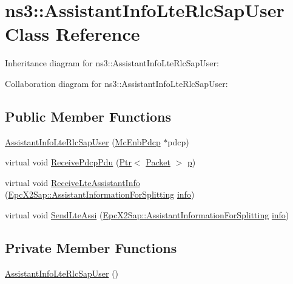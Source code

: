 \hypertarget{classns3_1_1AssistantInfoLteRlcSapUser}{}\section{ns3\+:\+:Assistant\+Info\+Lte\+Rlc\+Sap\+User Class Reference}
\label{classns3_1_1AssistantInfoLteRlcSapUser}


Inheritance diagram for ns3\+:\+:Assistant\+Info\+Lte\+Rlc\+Sap\+User\+:


Collaboration diagram for ns3\+:\+:Assistant\+Info\+Lte\+Rlc\+Sap\+User\+:
\subsection*{Public Member Functions}
\begin{DoxyCompactItemize}
\item 
\hyperlink{classns3_1_1AssistantInfoLteRlcSapUser_ac749cd032c4e18aeb183f85ae42375d1}{Assistant\+Info\+Lte\+Rlc\+Sap\+User} (\hyperlink{classns3_1_1McEnbPdcp}{Mc\+Enb\+Pdcp} $\ast$pdcp)
\item 
virtual void \hyperlink{classns3_1_1AssistantInfoLteRlcSapUser_af472b0a5d875f3de82b9636a24e61a31}{Receive\+Pdcp\+Pdu} (\hyperlink{classns3_1_1Ptr}{Ptr}$<$ \hyperlink{classns3_1_1Packet}{Packet} $>$ \hyperlink{lte__link__budget__x2__handover__measures_8m_ac9de518908a968428863f829398a4e62}{p})
\item 
virtual void \hyperlink{classns3_1_1AssistantInfoLteRlcSapUser_a49d8bd0df9a5a37a871f4ade413f9255}{Receive\+Lte\+Assistant\+Info} (\hyperlink{structns3_1_1EpcX2Sap_1_1AssistantInformationForSplitting}{Epc\+X2\+Sap\+::\+Assistant\+Information\+For\+Splitting} \hyperlink{classns3_1_1LteRlcSapUser_ae5c93c1d5c538c4f8cec3ad4ecbd898a}{info})
\item 
virtual void \hyperlink{classns3_1_1AssistantInfoLteRlcSapUser_ae567550ef2c16893536205d98cfce7b4}{Send\+Lte\+Assi} (\hyperlink{structns3_1_1EpcX2Sap_1_1AssistantInformationForSplitting}{Epc\+X2\+Sap\+::\+Assistant\+Information\+For\+Splitting} \hyperlink{classns3_1_1LteRlcSapUser_ae5c93c1d5c538c4f8cec3ad4ecbd898a}{info})
\end{DoxyCompactItemize}
\subsection*{Private Member Functions}
\begin{DoxyCompactItemize}
\item 
\hyperlink{classns3_1_1AssistantInfoLteRlcSapUser_aecf2a1cfb0ae54142d9588fa30c643f8}{Assistant\+Info\+Lte\+Rlc\+Sap\+User} ()
\end{DoxyCompactItemize}
